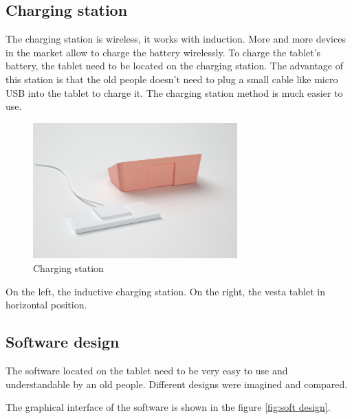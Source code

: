 \subsection{Charging station}

The charging station is wireless, it works with induction. More and more devices in the market allow to charge the battery wirelessly. To charge the tablet's battery, the tablet need to be located on the charging station. The advantage of this station is that the old people doesn't need to plug a small cable like micro USB into the tablet to charge it. The charging station method is much easier to use.

\begin{figure}[!htb]
    \centering
    \includegraphics[width=0.7\textwidth,keepaspectratio]{chap/designFig/VisioRender7.png}
    \caption{Charging station}
    \label{fig:charging station}
\end{figure}

On the left, the inductive charging station. On the right, the vesta tablet in horizontal position.

\clearpage

\subsection{Software design}

The software located on the tablet need to be very easy to use and understandable by an old people. Different designs were imagined and compared.

The graphical interface of the software is shown in the figure \ref{fig:soft design}.

